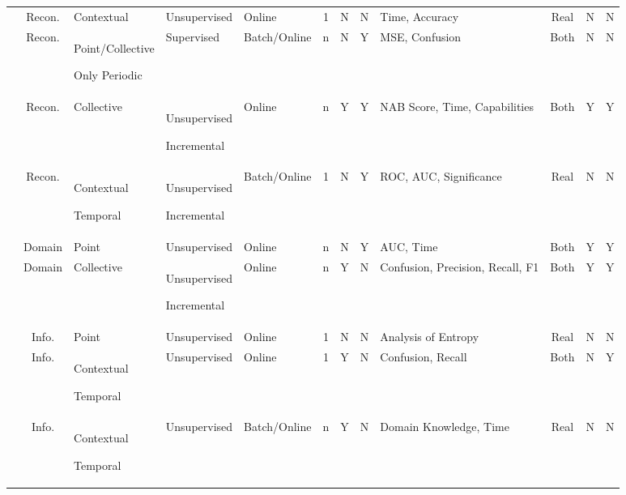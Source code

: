 {\begin{landscape}
\begin{table}[]
\begin{tabularx}{1\linewidth}{Xcp{80pt}p{70pt}p{70pt}cccp{110pt}ccc}
                \midrule
                \citet{hayes_contextual_2015} & Recon. & Contextual & Unsupervised & Online & 1 & N & N & Time, Accuracy & Real & N & N \\
                \citet{shipmon_time_2017} & Recon. & Point/Collective \par Only Periodic & Supervised & Batch/Online & n & N & Y & MSE, Confusion & Both & N & N \\
                \citet{ahmad_unsupervised_2017} & Recon. & Collective & Unsupervised \par Incremental & Online & n & Y & Y & NAB Score, Time, Capabilities & Both & Y & Y \\
                \citet{kanarachos_detecting_2017} & Recon. & Contextual \par Temporal & Unsupervised \par Incremental & Batch/Online & 1 & N & Y & ROC, AUC, Significance & Real & N & N \\
                \midrule
                \citet{liu_isolation_2008} & Domain & Point & Unsupervised & Online & n & N & Y & AUC, Time & Both & Y & Y \\
                \citet{dos_santos_teixeira_data_2010} & Domain & Collective & Unsupervised \par Incremental & Online & n & Y & N & Confusion, Precision, Recall, F1 & Both & Y & Y \\
                \midrule
                \citet{muter_entropy-based_2011} & Info. & Point & Unsupervised & Online & 1 & N & N & Analysis of Entropy & Real & N & N\\
                \citet{wang_statistical_2011} & Info. & Contextual \par Temporal & Unsupervised & Online & 1 & Y & N & Confusion, Recall & Both & N & Y \\
                \citet{rettig_online_2015} & Info. & Contextual \par Temporal & Unsupervised & Batch/Online & n & Y & N & Domain Knowledge, Time & Real & N & N \\
                \bottomrule
            \end{tabularx}

\end{table}
\end{landscape}}
